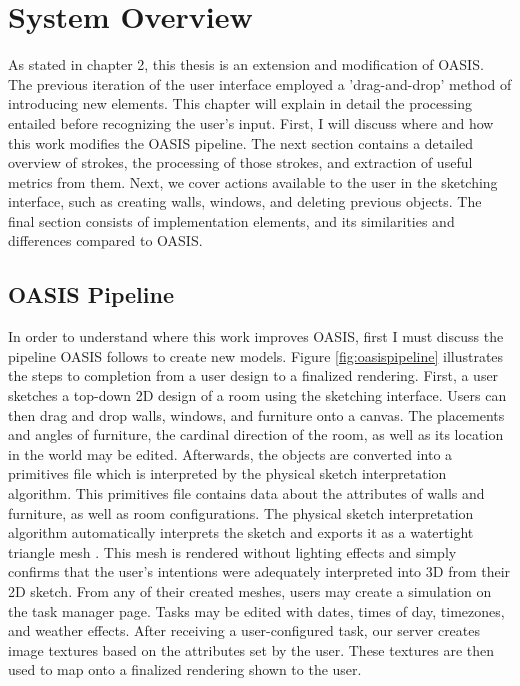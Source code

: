 \chapter{System Overview} \label{sec:system}

As stated in chapter 2, this thesis is an extension and modification of OASIS. The previous iteration of the user interface employed a 'drag-and-drop' method of introducing new elements. This chapter will explain in detail the processing entailed before recognizing the user's input. First, I will discuss where and how this work modifies the OASIS pipeline. The next section contains a detailed overview of strokes, the processing of those strokes, and extraction of useful metrics from them. Next, we cover actions available to the user in the sketching interface, such as creating walls, windows, and deleting previous objects. The final section consists of implementation elements, and its similarities and differences compared to OASIS.

\section{OASIS Pipeline}
In order to understand where this work improves OASIS, first I must discuss the pipeline OASIS follows to create new models. Figure \ref{fig:oasispipeline} illustrates the steps to completion from a user design to a finalized rendering. First, a user sketches a top-down 2D design of a room using the sketching interface. Users can then drag and drop walls, windows, and furniture onto a canvas. The placements and angles of furniture, the cardinal direction of the room, as well as its location in the world may be edited. Afterwards, the objects are converted into a primitives file which is interpreted by the physical sketch interpretation algorithm. This primitives file contains data about the attributes of walls and furniture, as well as room configurations. The physical sketch interpretation algorithm automatically interprets the sketch and exports it as a watertight triangle mesh  \cite{cutler2009inferring}. This mesh is rendered without lighting effects and simply confirms that the user's intentions were adequately interpreted into 3D from their 2D sketch. From any of their created meshes, users may create a simulation on the task manager page. Tasks may be edited with dates, times of day, timezones, and weather effects. After receiving a user-configured task, our server creates image textures based on the attributes set by the user. These textures are then used to map onto a finalized rendering shown to the user. \\


